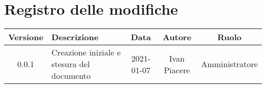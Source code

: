 \section*{Registro delle modifiche}

\begin{center}
	\begin{longtable}{|c|p{5cm}|c|c|c|}
	\hline
	\rowcolor{lighter-grayer}
	\textbf{Versione} & \textbf{Descrizione} & \textbf{Data} & \textbf{Autore} & \textbf{Ruolo} \\
	\hline
	\endfirsthead


	\hline
	0.0.1 & Creazione iniziale e stesura del documento & 2021-01-07 & Ivan Piacere & Amministratore \\
	\hline
	\end{longtable}
\end{center}